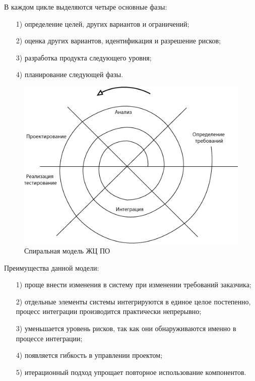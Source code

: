 В каждом цикле выделяются четыре основные фазы: 

\begin{enumerate}
    \item [1)] определение целей, других вариантов и ограничений;
    \item [2)] оценка других вариантов, идентификация и разрешение рисков;
    \item [3)] разработка продукта следующего уровня;
    \item [4)] планирование следующей фазы.
\end{enumerate}

\begin{figure}[h!]
    \center
    \includegraphics[scale=0.8]{fig/3.png}
    \caption{Спиральная модель ЖЦ ПО}
    \label{fig:3}
\end{figure}

Преимущества данной модели:

\begin{enumerate}
    \item [1)] проще внести изменения в систему при изменении требований заказчика;
    \item [2)] отдельные элементы системы интегрируются в единое целое постепенно, процесс интеграции производится практически непрерывно;
    \item [3)] уменьшается уровень рисков, так как они обнаруживаются именно в процессе интеграции;
    \item [4)] появляется гибкость в управлении проектом;
    \item [5)] итерационный подход упрощает повторное использование компонентов.
\end{enumerate}

